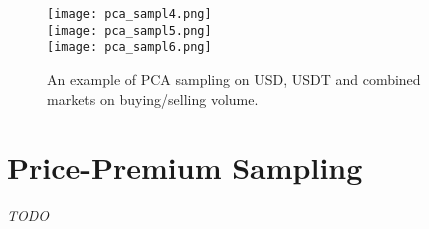 \begin{figure}[H]
	\centering
    \texttt{[image: pca\_sampl4.png]} \\
    \texttt{[image: pca\_sampl5.png]} \\
    \texttt{[image: pca\_sampl6.png]}
	\caption{An example of PCA sampling on USD, USDT and combined markets on buying/selling volume.}
    \label{fig:pca_sampl2}
\end{figure}


\section{Price-Premium Sampling}

\textit{TODO}